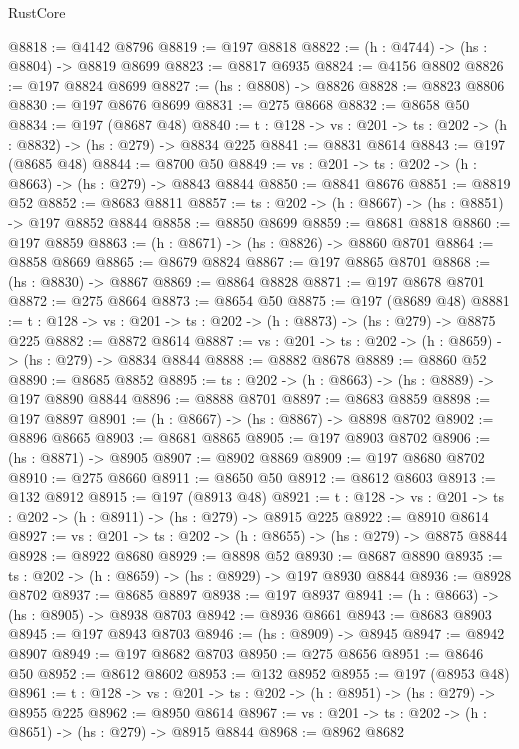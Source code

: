 \begin{lexlean}{RustCore}
\begin{coremodule}
@8818 := @4142 @8796
@8819 := @197 @8818
@8822 := (h : @4744) -> (hs : @8804) -> @8819 @8699
@8823 := @8817 @6935
@8824 := @4156 @8802
@8826 := @197 @8824 @8699
@8827 := (hs : @8808) -> @8826
@8828 := @8823 @8806
@8830 := @197 @8676 @8699
@8831 := @275 @8668
@8832 := @8658 @50
@8834 := @197 (@8687 @48)
@8840 := {t : @128} -> {vs : @201} -> {ts : @202} -> (h : @8832) -> (hs : @279) -> @8834 @225
@8841 := @8831 @8614
@8843 := @197 (@8685 @48)
@8844 := @8700 @50
@8849 := {vs : @201} -> {ts : @202} -> (h : @8663) -> (hs : @279) -> @8843 @8844
@8850 := @8841 @8676
@8851 := @8819 @52
@8852 := @8683 @8811
@8857 := {ts : @202} -> (h : @8667) -> (hs : @8851) -> @197 @8852 @8844
@8858 := @8850 @8699
@8859 := @8681 @8818
@8860 := @197 @8859
@8863 := (h : @8671) -> (hs : @8826) -> @8860 @8701
@8864 := @8858 @8669
@8865 := @8679 @8824
@8867 := @197 @8865 @8701
@8868 := (hs : @8830) -> @8867
@8869 := @8864 @8828
@8871 := @197 @8678 @8701
@8872 := @275 @8664
@8873 := @8654 @50
@8875 := @197 (@8689 @48)
@8881 := {t : @128} -> {vs : @201} -> {ts : @202} -> (h : @8873) -> (hs : @279) -> @8875 @225
@8882 := @8872 @8614
@8887 := {vs : @201} -> {ts : @202} -> (h : @8659) -> (hs : @279) -> @8834 @8844
@8888 := @8882 @8678
@8889 := @8860 @52
@8890 := @8685 @8852
@8895 := {ts : @202} -> (h : @8663) -> (hs : @8889) -> @197 @8890 @8844
@8896 := @8888 @8701
@8897 := @8683 @8859
@8898 := @197 @8897
@8901 := (h : @8667) -> (hs : @8867) -> @8898 @8702
@8902 := @8896 @8665
@8903 := @8681 @8865
@8905 := @197 @8903 @8702
@8906 := (hs : @8871) -> @8905
@8907 := @8902 @8869
@8909 := @197 @8680 @8702
@8910 := @275 @8660
@8911 := @8650 @50
@8912 := @8612 @8603
@8913 := @132 @8912
@8915 := @197 (@8913 @48)
@8921 := {t : @128} -> {vs : @201} -> {ts : @202} -> (h : @8911) -> (hs : @279) -> @8915 @225
@8922 := @8910 @8614
@8927 := {vs : @201} -> {ts : @202} -> (h : @8655) -> (hs : @279) -> @8875 @8844
@8928 := @8922 @8680
@8929 := @8898 @52
@8930 := @8687 @8890
@8935 := {ts : @202} -> (h : @8659) -> (hs : @8929) -> @197 @8930 @8844
@8936 := @8928 @8702
@8937 := @8685 @8897
@8938 := @197 @8937
@8941 := (h : @8663) -> (hs : @8905) -> @8938 @8703
@8942 := @8936 @8661
@8943 := @8683 @8903
@8945 := @197 @8943 @8703
@8946 := (hs : @8909) -> @8945
@8947 := @8942 @8907
@8949 := @197 @8682 @8703
@8950 := @275 @8656
@8951 := @8646 @50
@8952 := @8612 @8602
@8953 := @132 @8952
@8955 := @197 (@8953 @48)
@8961 := {t : @128} -> {vs : @201} -> {ts : @202} -> (h : @8951) -> (hs : @279) -> @8955 @225
@8962 := @8950 @8614
@8967 := {vs : @201} -> {ts : @202} -> (h : @8651) -> (hs : @279) -> @8915 @8844
@8968 := @8962 @8682

\end{coremodule}
\end{lexlean}
